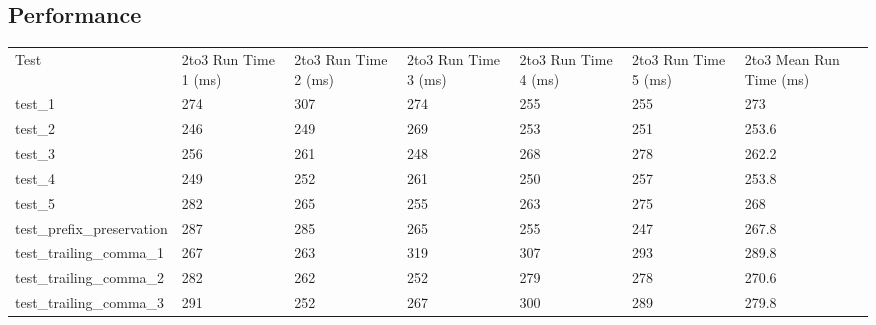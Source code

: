 \subsection{Performance}

\begin{table}[h]
    \begin{tabular}{@{}l|llllll@{}}
    \cmidrule(r){1-6}
    Test                                  & 2to3 Run Time 1 (ms) & 2to3 Run Time 2 (ms) & 2to3 Run Time 3 (ms) & 2to3 Run Time 4 (ms) & 2to3 Run Time 5 (ms) & 2to3 Mean Run Time (ms) \\ \cmidrule(r){1-6}
    test\_1                               & 274                  & 307                  & 274                  & 255                  & 255                  & 273                        \\
    test\_2                               & 246                  & 249                  & 269                  & 253                  & 251                  & 253.6                      \\
    test\_3                               & 256                  & 261                  & 248                  & 268                  & 278                  & 262.2                      \\ \cmidrule(r){1-6}
    test\_4                               & 249                  & 252                  & 261                  & 250                  & 257                  & 253.8                      \\
    test\_5                               & 282                  & 265                  & 255                  & 263                  & 275                  & 268                        \\
    test\_prefix\_preservation            & 287                  & 285                  & 265                  & 255                  & 247                  & 267.8                      \\
    test\_trailing\_comma\_1              & 267                  & 263                  & 319                  & 307                  & 293                  & 289.8                      \\
    test\_trailing\_comma\_2              & 282                  & 262                  & 252                  & 279                  & 278                  & 270.6                      \\
    test\_trailing\_comma\_3              & 291                  & 252                  & 267                  & 300                  & 289                  & 279.8                      \\

\end{tabular}
\end{table}
